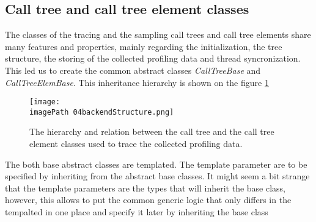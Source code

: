 \subsection{Call tree and call tree element classes}
The classes of the tracing and the sampling call trees and call tree elements share many features and properties, mainly regarding the initialization, the tree structure, the storing of the collected profiling data and thread syncronization. This led us to create the common abstract classes \textit{CallTreeBase} and \textit{CallTreeElemBase}. This inheritance hierarchy is shown on the figure \ref{fig:04backendStructure}


\begin{figure}
	\centering
		\texttt{[image: \\imagePath 04backendStructure.png]}
		\caption{The hierarchy and relation between the call tree and the call tree element classes used to trace the collected profiling data.}
	\label{fig:04backendStructure}
\end{figure}

The both base abstract classes are templated. The template parameter are to be specified by inheriting from the abstract base classes. It might seem a bit strange that the template parameters are the types that will inherit the base class, however, this allows to put the common generic logic that only differs in the tempalted in one place and specify it later by inheriting the base class

